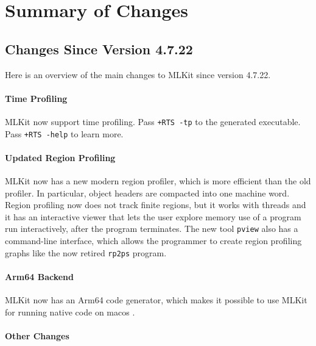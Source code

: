 \documentclass[12pt]{book}
\begin{document}
\chapter{Summary of Changes}

\section{Changes Since Version 4.7.22}
%

Here is an overview of the main changes to MLKit since version 4.7.22.

\subsubsection{Time Profiling}

MLKit now support time profiling. Pass \lstinline{+RTS -tp} to the generated
executable. Pass \lstinline{+RTS -help} to learn more.

\subsubsection{Updated Region Profiling}

MLKit now has a new modern region profiler, which is more efficient than the old
profiler. In particular, object headers are compacted into one machine
word. Region profiling now does not track finite regions, but it works with
threads and it has an interactive viewer that lets the user explore memory use
of a program run interactively, after the program terminates. The new tool
\lstinline{pview} also has a command-line interface, which allows the programmer
to create region profiling graphs like the now retired \lstinline{rp2ps}
program.

\subsubsection{Arm64 Backend}

MLKit now has an Arm64 code generator, which makes it possible to use MLKit for
running native code on macos \cite{elsman-arm64}.

\subsubsection{Other Changes}
\end{document}
